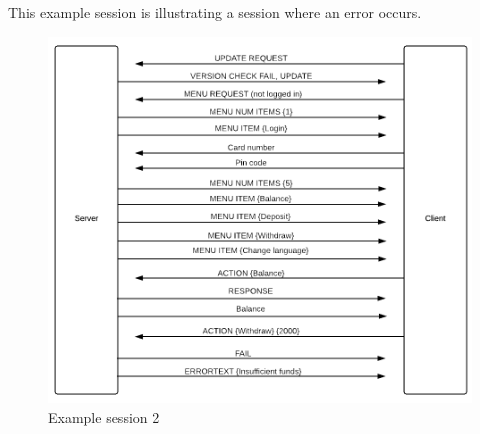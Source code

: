 \documentclass[a4paper,11pt]{article}
\begin{document}
\bigskip
This example session is illustrating a session where
an error occurs.

\begin{figure}[H]
\centering
\includegraphics[scale=0.8]{Session_fail.png}
\caption{Example session 2}
\end{figure}
\end{document}

